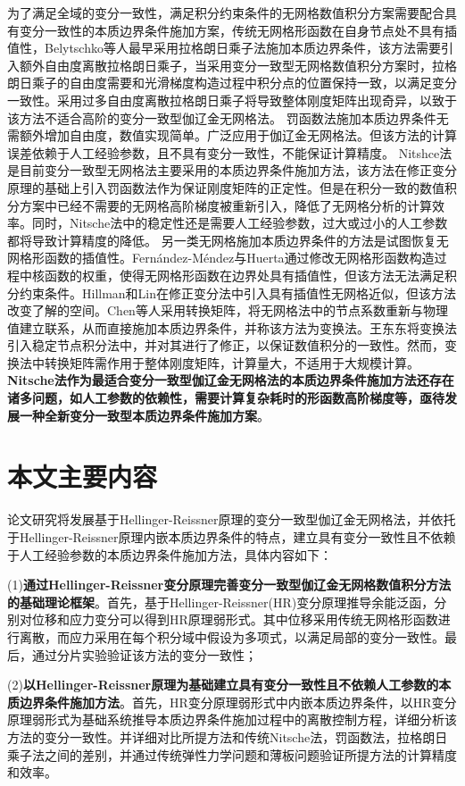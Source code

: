 为了满足全域的变分一致性，满足积分约束条件的无网格数值积分方案需要配合具有变分一致性的本质边界条件施加方案，传统无网格形函数在自身节点处不具有插值性，Belytschko等人\cite{belytschko1994}最早采用拉格朗日乘子法施加本质边界条件，该方法需要引入额外自由度离散拉格朗日乘子，当采用变分一致型无网格数值积分方案时，拉格朗日乘子的自由度需要和光滑梯度构造过程中积分点的位置保持一致，以满足变分一致性。采用过多自由度离散拉格朗日乘子将导致整体刚度矩阵出现奇异，以致于该方法不适合高阶的变分一致型伽辽金无网格法。
罚函数法\cite{zhu1998}施加本质边界条件无需额外增加自由度，数值实现简单。广泛应用于伽辽金无网格法。但该方法的计算误差依赖于人工经验参数，且不具有变分一致性，不能保证计算精度。
Nitshce法\cite{fernandez-mendez2004}是目前变分一致型无网格法主要采用的本质边界条件施加方法，该方法在修正变分原理的基础上引入罚函数法作为保证刚度矩阵的正定性。但是在积分一致的数值积分方案中已经不需要的无网格高阶梯度被重新引入，降低了无网格分析的计算效率。同时，Nitsche法中的稳定性还是需要人工经验参数，过大或过小的人工参数都将导致计算精度的降低。
另一类无网格施加本质边界条件的方法是试图恢复无网格形函数的插值性。Fernández-Méndez与Huerta\cite{fernandez-mendez2004}通过修改无网格形函数构造过程中核函数的权重，使得无网格形函数在边界处具有插值性，但该方法无法满足积分约束条件。Hillman和Lin\cite{hillman2021}在修正变分法中引入具有插值性无网格近似，但该方法改变了解的空间。Chen等人\cite{chen1996}采用转换矩阵，将无网格法中的节点系数重新与物理值建立联系，从而直接施加本质边界条件，并称该方法为变换法。王东东\cite{wang2015}将变换法引入稳定节点积分法中，并对其进行了修正，以保证数值积分的一致性。然而，变换法中转换矩阵需作用于整体刚度矩阵，计算量大，不适用于大规模计算。
\textbf{Nitsche法作为最适合变分一致型伽辽金无网格法的本质边界条件施加方法还存在诸多问题，如人工参数的依赖性，需要计算复杂耗时的形函数高阶梯度等，亟待发展一种全新变分一致型本质边界条件施加方案}。

\section{本文主要内容}
论文研究将发展基于Hellinger-Reissner原理的变分一致型伽辽金无网格法，并依托于Hellinger-Reissner原理内嵌本质边界条件的特点，建立具有变分一致性且不依赖于人工经验参数的本质边界条件施加方法，具体内容如下：

(1)\textbf{通过Hellinger-Reissner变分原理完善变分一致型伽辽金无网格数值积分方法的基础理论框架}。首先，基于Hellinger-Reissner(HR)变分原理推导余能泛函，分别对位移和应力变分可以得到HR原理弱形式。其中位移采用传统无网格形函数进行离散，而应力采用在每个积分域中假设为多项式，以满足局部的变分一致性。最后，通过分片实验验证该方法的变分一致性；

(2)\textbf{以Hellinger-Reissner原理为基础建立具有变分一致性且不依赖人工参数的本质边界条件施加方法}。首先，HR变分原理弱形式中内嵌本质边界条件，以HR变分原理弱形式为基础系统推导本质边界条件施加过程中的离散控制方程，详细分析该方法的变分一致性。并详细对比所提方法和传统Nitsche法，罚函数法，拉格朗日乘子法之间的差别，并通过传统弹性力学问题和薄板问题验证所提方法的计算精度和效率。



